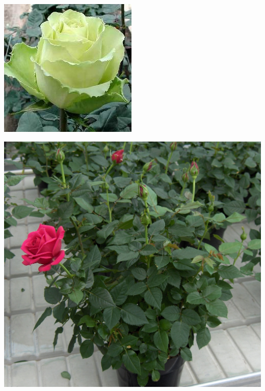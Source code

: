 \documentclass{article}
\begin{document}
\begin{center}
\includegraphics[width=0.9\textheight, angle=90]{../Rose_Limbo_Green.jpg}
\end{center}
\newpage

\begin{center}
\includegraphics[width=0.9\textheight, angle=90]{../Rose_Potted.jpg}
\end{center}
\newpage
\end{document}
